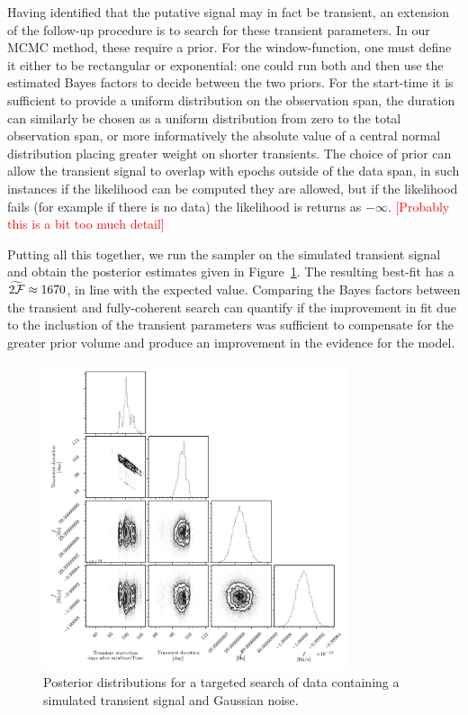 \documentclass[aps, prd, twocolumn, superscriptaddress, floatfix, showpacs, nofootinbib, longbibliography]{revtex4-1}
\newcommand{\comment}[1]{\textcolor{red}{[#1]}}
\begin{document}
Having identified that the putative signal may in fact be transient, an extension
of the follow-up procedure is to search for these transient parameters. In our
MCMC method, these require a prior. For the window-function, one must define it
either to be rectangular or exponential: one could run both and then use the
estimated Bayes factors to decide between the two priors. For the start-time it
is sufficient to provide a uniform distribution on the observation span, the
duration can similarly be chosen as a uniform distribution from zero to the
total observation span, or more informatively the absolute value of a central
normal distribution placing greater weight on shorter transients. The choice of
prior can allow the transient signal to overlap with epochs outside of the data
span, in such instances if the likelihood can be computed they are allowed, but
if the likelihood fails (for example if there is no data) the likelihood is
returns as $-\infty$.
\comment{Probably this is a bit too much detail}

Putting all this together, we run the sampler on the
simulated transient signal and obtain the posterior estimates given in
Figure~\ref{fig_transient_posterior}. The resulting best-fit has a
$\widetilde{2{\mathcal{F}}}\approx 1670$, in line with the expected value. Comparing the
Bayes factors between the transient and fully-coherent search can quantify if
the improvement in fit due to the inclustion of the transient parameters was
sufficient to compensate for the greater prior volume and produce an
improvement in the evidence for the model.

\begin{figure}[htb]
\centering
\includegraphics[width=0.8\textwidth]{transient_search_corner}
\caption{Posterior distributions for a targeted search of data containing
a simulated transient signal and Gaussian noise.}
\label{fig_transient_posterior}
\end{figure}
\end{document}
